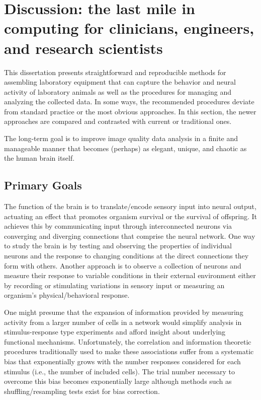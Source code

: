 % 

\thispagestyle{myheadings}

\chapter{Discussion: the last mile in computing for clinicians, engineers, and research scientists}
\label{sec:discussion}


This dissertation presents straightforward and reproducible methods for assembling laboratory equipment that can capture the behavior and neural activity of laboratory animals as well as the procedures for managing and analyzing the collected data.
In some ways, the recommended procedures deviate from standard practice or the most obvious approaches.
In this section, the newer approaches are compared and contrasted with current or traditional ones.

The long-term goal is to improve image quality data analysis in a finite and manageable manner that becomes (perhaps) as elegant, unique, and chaotic as the human brain itself.

\section{Primary Goals}\label{sec:primary-goals}

The function of the brain is to translate/encode sensory input into neural output, actuating an effect that promotes organism survival or the survival of offspring.
It achieves this by communicating input through interconnected neurons via converging and diverging connections that comprise the neural network.
One way to study the brain is by testing and observing the properties of individual neurons and the response to changing conditions at the direct connections they form with others.
Another approach is to observe a collection of neurons and measure their response to variable conditions in their external environment either by recording or stimulating variations in sensory input or measuring an organism's physical/behavioral response.

One might presume that the expansion of information provided by measuring activity from a larger number of cells in a network would simplify analysis in stimulus-response type experiments and afford insight about underlying functional mechanisms.
Unfortunately, the correlation and information theoretic procedures traditionally used to make these associations suffer from a systematic bias that exponentially grows with the number responses considered for each stimulus (i.e., the number of included cells).
The trial number necessary to overcome this bias becomes exponentially large although methods such as shuffling/resampling tests exist for bias correction.

